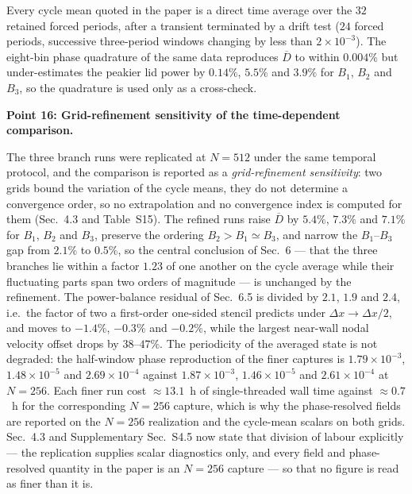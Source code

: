 \documentclass[11pt,a4paper]{article}
\begin{document}
Every cycle mean quoted in the paper is a direct time average over the $32$
retained forced periods, after a transient terminated by a drift test
($24$ forced periods, successive three-period windows changing by less than
$2\times10^{-3}$). The eight-bin phase quadrature of the same data reproduces
$\overline{D}$ to within $0.004\%$ but under-estimates the peakier lid power by
$0.14\%$, $5.5\%$ and $3.9\%$ for $B_1$, $B_2$ and $B_3$, so the quadrature is
used only as a cross-check.

\vspace{0.5em}

\noindent\textbf{Point 16: Grid-refinement sensitivity of the time-dependent
comparison.}

The three branch runs were replicated at $N=512$ under the same temporal
protocol, and the comparison is reported as a \emph{grid-refinement
sensitivity}: two grids bound the variation of the cycle means, they do not
determine a convergence order, so no extrapolation and no convergence index is
computed for them (Sec.~4.3 and Table~S15). The refined runs raise
$\overline{D}$ by $5.4\%$, $7.3\%$ and $7.1\%$ for $B_1$, $B_2$ and $B_3$,
preserve the ordering $B_2>B_1\simeq B_3$, and narrow the $B_1$--$B_3$ gap from
$2.1\%$ to $0.5\%$, so the central conclusion of Sec.~6 --- that the three
branches lie within a factor $1.23$ of one another on the cycle average while
their fluctuating parts span two orders of magnitude --- is unchanged by the
refinement. The power-balance residual of Sec.~6.5 is divided by $2.1$, $1.9$
and $2.4$, i.e.\ the factor of two a first-order one-sided stencil predicts under
$\Delta x\to\Delta x/2$, and moves to $-1.4\%$, $-0.3\%$ and $-0.2\%$, while the
largest near-wall nodal velocity offset drops by $38$--$47\%$. The
periodicity of the averaged state is not degraded: the half-window phase
reproduction of the finer captures is $1.79\times10^{-3}$,
$1.48\times10^{-5}$ and $2.69\times10^{-4}$ against $1.87\times10^{-3}$,
$1.46\times10^{-5}$ and $2.61\times10^{-4}$ at $N=256$. Each finer run cost
$\approx13.1$~h of single-threaded wall time against $\approx0.7$~h for the
corresponding $N=256$ capture, which is why the phase-resolved fields are
reported on the $N=256$ realization and the cycle-mean scalars on both grids.
Sec.~4.3 and Supplementary Sec.~S4.5 now state that division of labour
explicitly --- the replication supplies scalar diagnostics only, and every field
and phase-resolved quantity in the paper is an $N=256$ capture --- so that no
figure is read as finer than it is.
\end{document}
